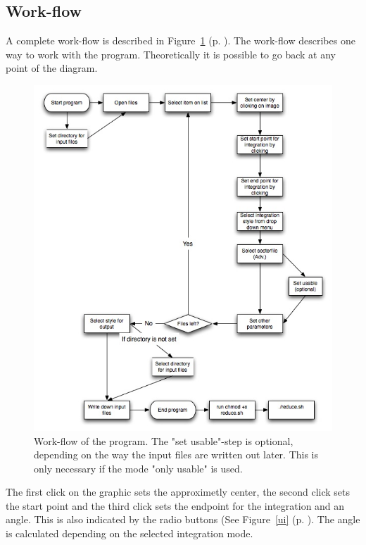 \subsection{Work-flow}
A complete work-flow is described in Figure~\ref{workflow} (p. \pageref{workflow}). The work-flow describes one way to work with the program. Theoretically it is possible to go back at any point of the diagram. 

\begin{figure}
\includegraphics[width=12cm]{diagram}
\caption{Work-flow of the program. The "set usable"-step is optional, depending on the way the input files are written out later. This is only necessary if the mode "only usable" is used.  }
\label{workflow} 
\end{figure} 
The first click on the graphic sets the approximetly center, the second click sets the start point and the third click sets the endpoint for the integration and an angle. This is also indicated by the radio buttons (See Figure~\ref{ui} (p. \pageref{ui}). The angle is calculated depending on the selected integration mode.

